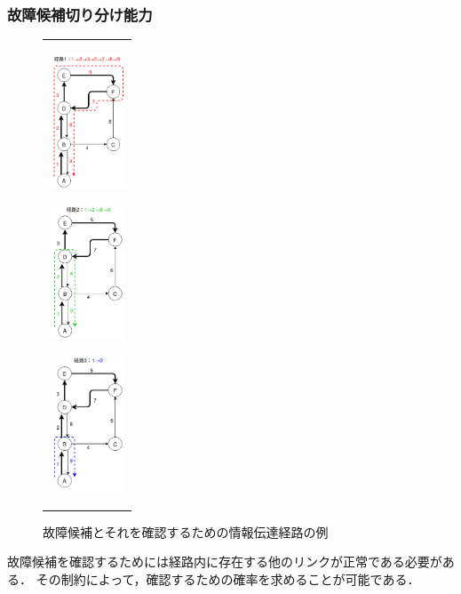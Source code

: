 \documentclass[11pt]{jsarticle}%
\begin{document}
\begin{multicols}{2}
  \subsubsection{故障候補切り分け能力}

  \begin{figure}[H]
    \centering
       \begin{tabular}{c}
          \begin{minipage}{0.30\hsize}
          \centering
          \includegraphics[height=4cm]{../figure/route1.png}
             \label{fig:route1}
          \end{minipage}
          \begin{minipage}{0.30\hsize}
          \centering
          \includegraphics[height=4cm]{../figure/route2.png}
             \label{fig:route2}
          \end{minipage}
          \begin{minipage}{0.30\hsize}
             \centering
             \includegraphics[height=4cm]{../figure/route3.png}
                \label{fig:route2}
             \end{minipage}
       \end{tabular} 
       \caption{故障候補とそれを確認するための情報伝達経路の例}%
       \label{fig:route}
 \end{figure}
故障候補を確認するためには経路内に存在する他のリンクが正常である必要がある．
その制約によって，確認するための確率を求めることが可能である．


\end{multicols}
\end{document}
